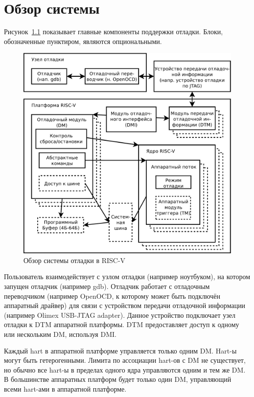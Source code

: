\chapter{Обзор системы} \label{overview}

Рисунок~\ref{fig:overview} показывает главные компоненты поддержки отладки.
Блоки, обозначенные пунктиром, являются опциональными.

\begin{figure}
   \centering
   \includegraphics[width=\textwidth]{fig/overview-eps-converted-to.pdf}
   \caption{Обзор системы отладки в RISC-V}
   \label{fig:overview}
\end{figure}

Пользователь взаимодействует с узлом отладки (например ноутбуком), на котором
запущен отладчик (например gdb). Отладчик работает с отладочным переводчиком
(например OpenOCD, к которому может быть подключён аппаратный драйвер) для связи 
с устройством передачи отладочной информации (например Olimex USB-JTAG adapter).
Данное устройство подключает узел отладки к DTM аппаратной платформы.
DTM предоставляет доступ к одному или нескольким DM, используя DMI.

Каждый hart в аппаратной платформе управляется только одним DM. Hart-ы могут быть
гетерогенными. Лимита по ассоциации hart-ов с DM не существует, но обычно
все hart-ы в пределах одного ядра управляются одним и тем же DM. В большинстве аппаратных платформ
будет только один DM, управляющий всеми hart-ами в аппаратной платформе.


